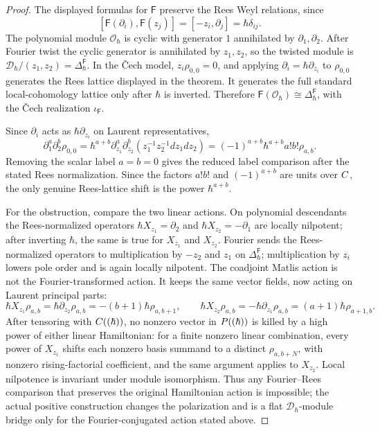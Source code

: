 \begin{proof}
  The displayed formulas for \(\mathsf F\) preserve the Rees Weyl
  relations, since
  \[
    [\mathsf F(\partial_i),\mathsf F(z_j)]
      =[-z_i,\partial_j]=\hbar\delta_{ij}.
  \]
  The polynomial module \(\mathcal O_\hbar\) is cyclic with generator
  \(1\) annihilated by \(\partial_1,\partial_2\).  After Fourier twist
  the cyclic generator is annihilated by \(z_1,z_2\), so the twisted
  module is \(\mathcal D_\hbar/(z_1,z_2)=\Delta^{\mathsf F}_\hbar\).
  In the \v{C}ech model, \(z_i\rho_{0,0}=0\), and applying
  \(\partial_i=\hbar\partial_{z_i}\) to \(\rho_{0,0}\) generates the
  Rees lattice displayed in the theorem.  It generates the full
  standard local-cohomology lattice only after \(\hbar\) is inverted.
  Therefore
  \(\mathsf F(\mathcal O_\hbar)\cong\Delta^{\mathsf F}_\hbar\), with the
  \v{C}ech realization \(\iota_{\mathsf F}\).

  Since \(\partial_i\) acts as \(\hbar\partial_{z_i}\) on Laurent
  representatives,
  \[
    \partial_1^a\partial_2^b\rho_{0,0}
    =
    \hbar^{a+b}
    \partial_{z_1}^a\partial_{z_2}^b
      (z_1^{-1}z_2^{-1}dz_1dz_2)
    =
    (-1)^{a+b}\hbar^{a+b}a!b!\rho_{a,b}.
  \]
  Removing the scalar label \(a=b=0\) gives the reduced label comparison
  after the stated Rees normalization.  Since the factors \(a!b!\) and
  \((-1)^{a+b}\) are units over \(C\), the only genuine Rees-lattice
  shift is the power \(\hbar^{a+b}\).

  For the obstruction, compare the two linear actions.  On polynomial
  descendants the Rees-normalized operators
  \(\hbar X_{z_1}=\partial_2\) and
  \(\hbar X_{z_2}=-\partial_1\) are locally nilpotent; after inverting
  \(\hbar\), the same is true for \(X_{z_1}\) and \(X_{z_2}\).  Fourier
  sends the Rees-normalized operators to multiplication by \(-z_2\) and
  \(z_1\) on \(\Delta^{\mathsf F}_\hbar\); multiplication by \(z_i\)
  lowers pole order and is again locally nilpotent.  The coadjoint
  Matlis action is not the Fourier-transformed action.  It keeps the
  same vector fields, now acting on Laurent principal parts:
  \[
    \hbar X_{z_1}\rho_{a,b}
      =\hbar\partial_{z_2}\rho_{a,b}
      =-(b+1)\hbar\rho_{a,b+1},\qquad
    \hbar X_{z_2}\rho_{a,b}
      =-\hbar\partial_{z_1}\rho_{a,b}
      =(a+1)\hbar\rho_{a+1,b}.
  \]
  After tensoring with \(C((\hbar))\), no nonzero vector in
  \(P((\hbar))\) is killed by a high power of either linear
  Hamiltonian: for a finite nonzero linear combination, every power of
  \(X_{z_1}\) shifts each nonzero basis summand to a distinct
  \(\rho_{a,b+N}\), with nonzero rising-factorial coefficient, and the
  same argument applies to \(X_{z_2}\).  Local nilpotence is invariant
  under module isomorphism.
  Thus any Fourier--Rees comparison that preserves the original
  Hamiltonian action is impossible; the actual positive construction
  changes the polarization and is a flat \( \mathcal D_\hbar \)-module
  bridge only for the Fourier-conjugated action stated above.
\end{proof}

